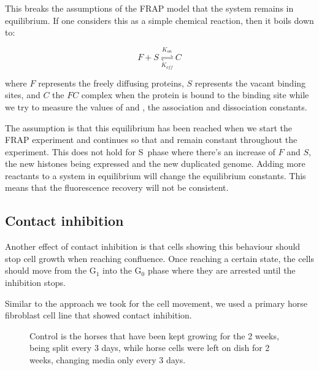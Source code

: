   This breaks the assumptions of the FRAP model that the system remains in equilibrium. If one
  considers this as a simple chemical reaction, then it boils down to:
    
  \begin{displaymath}
    F + S \overset{K_{on}}{\underset{K_{off}}{\rightleftharpoons}} C
  \end{displaymath}
  
  where $F$ represents the freely diffusing proteins, $S$ represents the vacant binding sites, and
  $C$ the $FC$ complex when the protein is bound to the binding site while we try to measure the
  values of \Kon and \Koff, the association and dissociation constants.
  
  The assumption is that this equilibrium has been reached when we start the FRAP experiment and
  continues so that \Kon and \Koff remain constant throughout the experiment. This does
  not hold for S~phase where there's an increase of $F$ and $S$, the new histones being expressed
  and the new duplicated genome. Adding more reactants to a system in equilibrium will change the equilibrium
  constants. This means that the fluorescence recovery will not be consistent.
  
  \subsection{Contact inhibition}
  \label{sec:frap-cell-cycle-horse}
    
    Another effect of contact inhibition is that cells showing this behaviour should stop cell
    growth when reaching confluence. Once reaching a certain state, the cells should move from
    the G$_1$ into the G$_0$ phase where they are arrested until the inhibition stops.
    
    Similar to the approach we took for the cell movement, we used a primary horse fibroblast
    cell line that showed contact inhibition.
    
    \begin{figure}
      \centering
                   {Control is the horses that have been kept growing for the 2 weeks,
                    being split every 3 days, while horse cells were left on dish for
                    2 weeks, changing media only every 3 days.}
      \label{fig:horse-facs}
    \end{figure}
    
